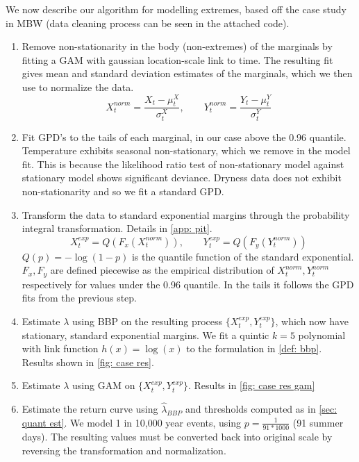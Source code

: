 \documentclass[12pt]{article}
\begin{document}
  We now describe our algorithm for modelling extremes, based off the case study in MBW (data cleaning process can be seen in the attached code).
  \begin{enumerate}
    \item Remove non-stationarity in the body (non-extremes) of the marginals by fitting a GAM with gaussian location-scale link to time. The resulting fit gives mean and standard deviation estimates of the marginals, which we then use to normalize the data. 
      \begin{equation}
          X_t^{norm} = \frac{X_t - \mu_t^X}{\sigma_t^X}, \qquad Y_t^{norm} = \frac{Y_t - \mu_t^Y}{\sigma_t^Y}
      \end{equation}
    \item Fit GPD's to the tails of each marginal, in our case above the 0.96 quantile. Temperature exhibits seasonal non-stationary, which we remove in the model fit. This is because the likelihood ratio test of non-stationary model against stationary model shows significant deviance. Dryness data does not exhibit non-stationarity and so we fit a standard GPD.
    \item Transform the data to standard exponential margins through the probability integral transformation. Details in \cref{app: pit}. 
      \begin{equation}
        X_t^{exp} = Q(F_x(X_t^{norm})), \qquad Y_t^{exp} = Q(F_y(Y_t^{norm}))
      \end{equation}
    $Q(p) = -\log(1 - p)$ is the quantile function of the standard exponential. $F_x, F_y$ are defined piecewise as the empirical distribution of $X_t^{norm}, Y_t^{norm}$ respectively for values under the 0.96 quantile. In the tails it follows the GPD fits from the previous step. 
    \item Estimate $\lambda$ using BBP on the resulting process $\{X_t^{exp}, Y_t^{exp}\}$, which now have stationary, standard exponential margins. We fit a quintic $k = 5$ polynomial with link function $h(x) = \log(x)$ to the formulation in \cref{def: bbp}. Results shown in \cref{fig: case res}.
    \item Estimate $\lambda$ using GAM on $\{X_t^{exp}, Y_t^{exp}\}$. Results in \cref{fig: case res gam}
    \item Estimate the return curve using $\hat{\lambda}_{BBP}$ and thresholds computed as in \cref{sec: quant est}. We model 1 in 10,000 year events, using $p = \frac{1}{91*1000}$ (91 summer days). The resulting values must be converted back into original scale by reversing the transformation and normalization.
  \end{enumerate}
\end{document}
